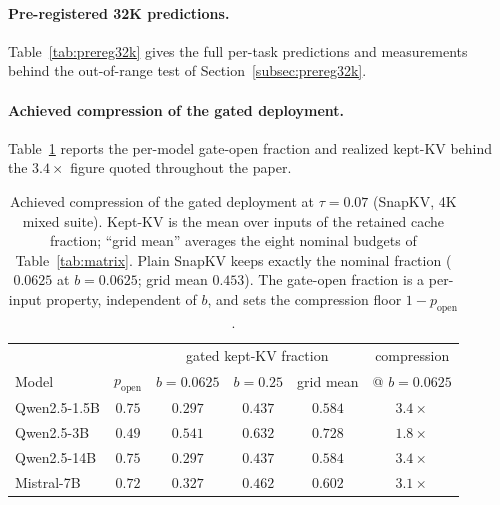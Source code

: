 \paragraph{Pre-registered 32K predictions.} Table~\ref{tab:prereg32k}
gives the full per-task predictions and measurements behind the
out-of-range test of Section~\ref{subsec:prereg32k}.

\begin{table}[h]
\centering
\caption{Pre-registered 32K predictions vs.\ measurements
(Qwen2.5-1.5B, $N = 100$ per task). Predicted intervals = 4K/16K ratio
band $\times$ measured 32K headroom, frozen before the sweep.}
\label{tab:prereg32k}
\end{table}

\paragraph{Achieved compression of the gated deployment.} Table~\ref{tab:achieved-compression}
reports the per-model gate-open fraction and realized kept-KV behind the
$3.4\times$ figure quoted throughout the paper.

\begin{table}[t]
\centering
\caption{Achieved compression of the gated deployment at $\tau=0.07$ (SnapKV,
4K mixed suite). Kept-KV is the mean over inputs of the retained cache
fraction; ``grid mean'' averages the eight nominal budgets of
Table~\ref{tab:matrix}. Plain SnapKV keeps exactly the nominal fraction
($0.0625$ at $b=0.0625$; grid mean $0.453$). The gate-open fraction is a
per-input property, independent of $b$, and sets the compression floor
$1-p_{\text{open}}$.}
\label{tab:achieved-compression}
\begin{tabular}{lccccc}
\toprule
 & & \multicolumn{3}{c}{gated kept-KV fraction} & compression \\
\cmidrule(lr){3-5}
Model & $p_{\text{open}}$ & $b{=}0.0625$ & $b{=}0.25$ & grid mean & @ $b{=}0.0625$ \\
\midrule
Qwen2.5-1.5B & $0.75$ & $0.297$ & $0.437$ & $0.584$ & $3.4\times$ \\
Qwen2.5-3B   & $0.49$ & $0.541$ & $0.632$ & $0.728$ & $1.8\times$ \\
Qwen2.5-14B  & $0.75$ & $0.297$ & $0.437$ & $0.584$ & $3.4\times$ \\
Mistral-7B   & $0.72$ & $0.327$ & $0.462$ & $0.602$ & $3.1\times$ \\
\bottomrule
\end{tabular}
\end{table}

